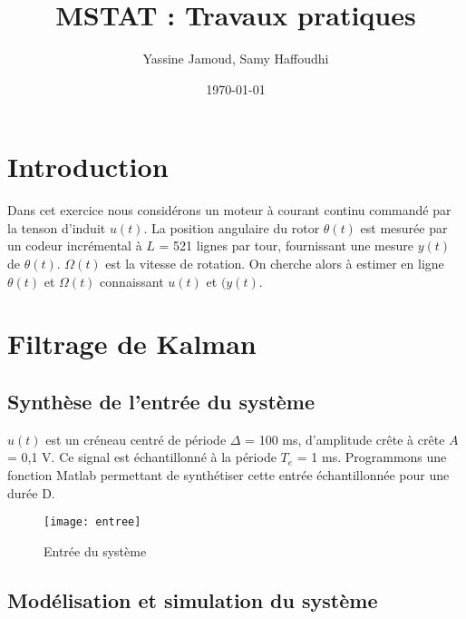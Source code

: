 \documentclass[12pt,a4paper,titlepage]{article}
\title{MSTAT : Travaux pratiques}
\author{Yassine Jamoud, Samy Haffoudhi}
\date{\today}
\begin{document}
\maketitle

\section*{Introduction}

Dans cet exercice nous considérons un moteur à courant continu commandé
par la tenson d'induit $u(t)$. La position angulaire du rotor $\theta(t)$ est mesurée par
un codeur incrémental à $L$ = 521 lignes par tour, fournissant une mesure $y(t)$ de $\theta(t)$.
$\Omega(t)$ est la vitesse de rotation. On cherche alors à estimer en ligne $\theta(t)$
et $\Omega(t)$ connaissant $u(t)$ et $(y(t)$.

\setcounter{section}{5}

\section{Filtrage de Kalman}

\subsection{Synthèse de l'entrée du système}

$u(t)$ est un créneau centré de période $\Delta$ = 100 ms, d'amplitude crête à crête
$A$ = 0,1 V. Ce signal est échantillonné à la période $T_e$ = 1 ms. Programmons une
fonction Matlab permettant de synthétiser cette entrée échantillonnée pour une durée D.



\begin{figure}[H]
    \caption{Entrée du système}
    \texttt{[image: entree]}
    \centering
\end{figure}

\subsection{Modélisation et simulation du système}
\end{document}
